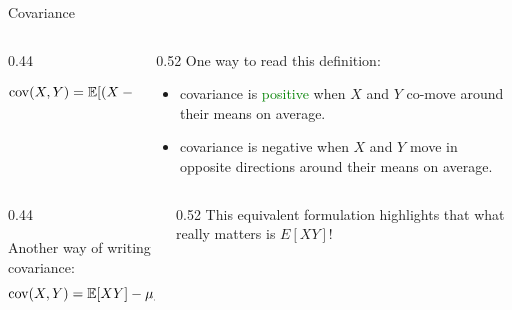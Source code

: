 \documentclass[9pt,english,aspectratio=169]{beamer}
\begin{document}
\begin{frame}{Covariance}

  \begin{columns}[c]
    \begin{column}{0.44\textwidth}
      \begin{definitionbox}[Covariance]
        \vspace{-1em}
        \[
          \operatorname{cov}(X, Y) = \mathbb{E}\!\left[(X - \mu_X)(Y - \mu_Y)\right].
        \]
      \end{definitionbox}
    \end{column}
    \begin{column}{0.52\textwidth}
      One way to read this definition:
      \begin{itemize}
        \item covariance is \textcolor{green}{positive} when $X$ and $Y$ co-move around their means on average.   
        \item covariance is \textcolor{vermillion}{negative} when $X$ and $Y$ move in opposite directions around their means on average.   
      \end{itemize}
    \end{column}
  \end{columns}
  \pause
  \vspace{2em}
    \begin{columns}[T]
    \begin{column}{0.44\textwidth}
      \begin{methodbox}
        Another way of writing covariance:
        \[
          \operatorname{cov}(X, Y) = \mathbb{E}[XY] - \mu_X\, \mu_Y.
        \]
      \end{methodbox}
    \end{column}
    \begin{column}{0.52\textwidth}
      \vspace{2em}
      This equivalent formulation highlights that what really matters is $E[XY]$!
    \end{column}
  \end{columns}
   


\end{frame}
\end{document}
